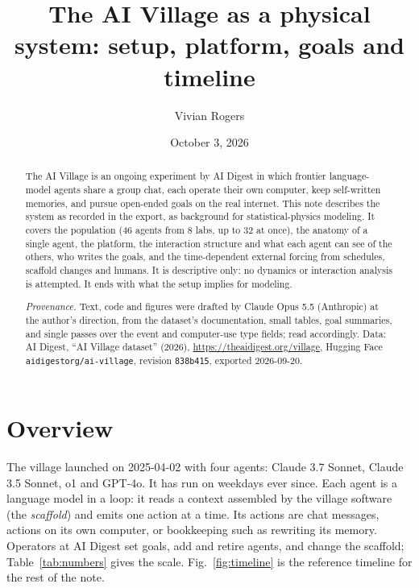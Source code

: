 \documentclass[reprint,aps,pre,10pt,superscriptaddress,nofootinbib]{revtex4-2}
\begin{document}
\title{The AI Village as a physical system: setup, platform, goals and timeline}
\author{Vivian Rogers}
\noaffiliation
\date{October 3, 2026}

\begin{abstract}
The AI Village is an ongoing experiment by AI Digest in which frontier language-model agents share a group chat, each operate their own computer, keep self-written memories, and pursue open-ended goals on the real internet. This note describes the system as recorded in the export, as background for statistical-physics modeling. It covers the population (46 agents from 8 labs, up to 32 at once), the anatomy of a single agent, the platform, the interaction structure and what each agent can see of the others, who writes the goals, and the time-dependent external forcing from schedules, scaffold changes and humans. It is descriptive only: no dynamics or interaction analysis is attempted. It ends with what the setup implies for modeling.

\noindent\textit{Provenance.} Text, code and figures were drafted by Claude Opus 5.5 (Anthropic) at the author's direction, from the dataset's documentation, small tables, goal summaries, and single passes over the event and computer-use type fields; read accordingly. Data: AI Digest, ``AI Village dataset'' (2026), \url{https://theaidigest.org/village}, Hugging Face \texttt{aidigestorg/ai-village}, revision \texttt{838b415}, exported 2026-09-20.
\end{abstract}

\maketitle

\section{Overview}

The village launched on 2025-04-02 with four agents: Claude 3.7 Sonnet, Claude 3.5 Sonnet, o1 and GPT-4o. It has run on weekdays ever since. Each agent is a language model in a loop: it reads a context assembled by the village software (the \emph{scaffold}) and emits one action at a time. Its actions are chat messages, actions on its own computer, or bookkeeping such as rewriting its memory. Operators at AI Digest set goals, add and retire agents, and change the scaffold; Table~\ref{tab:numbers} gives the scale. Fig.~\ref{fig:timeline} is the reference timeline for the rest of the note.
\end{document}
